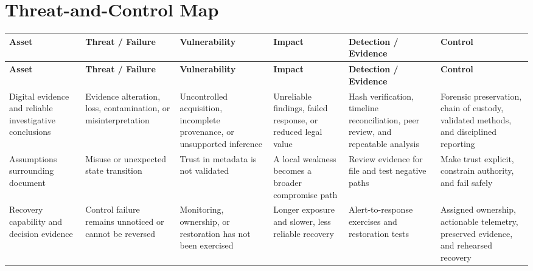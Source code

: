 \documentclass[11pt,letterpaper]{article}
\begin{document}
\section*{Threat-and-Control Map}
\begingroup\scriptsize\setlength{\tabcolsep}{2pt}
\begin{longtable}{>{\raggedright\arraybackslash}p{}>{\raggedright\arraybackslash}p{}>{\raggedright\arraybackslash}p{}>{\raggedright\arraybackslash}p{}>{\raggedright\arraybackslash}p{}>{\raggedright\arraybackslash}p{}}
\toprule\rowcolor{Navy}\color{white}\textbf{Asset} & \color{white}\textbf{Threat / Failure} & \color{white}\textbf{Vulnerability} & \color{white}\textbf{Impact} & \color{white}\textbf{Detection / Evidence} & \color{white}\textbf{Control}\\\midrule
\endfirsthead
\toprule\rowcolor{Navy}\color{white}\textbf{Asset} & \color{white}\textbf{Threat / Failure} & \color{white}\textbf{Vulnerability} & \color{white}\textbf{Impact} & \color{white}\textbf{Detection / Evidence} & \color{white}\textbf{Control}\\\midrule
\endhead
Digital evidence and reliable investigative conclusions & Evidence alteration, loss, contamination, or misinterpretation & Uncontrolled acquisition, incomplete provenance, or unsupported inference & Unreliable findings, failed response, or reduced legal value & Hash verification, timeline reconciliation, peer review, and repeatable analysis & Forensic preservation, chain of custody, validated methods, and disciplined reporting\\\midrule
Assumptions surrounding document & Misuse or unexpected state transition & Trust in metadata is not validated & A local weakness becomes a broader compromise path & Review evidence for file and test negative paths & Make trust explicit, constrain authority, and fail safely\\\midrule
Recovery capability and decision evidence & Control failure remains unnoticed or cannot be reversed & Monitoring, ownership, or restoration has not been exercised & Longer exposure and slower, less reliable recovery & Alert-to-response exercises and restoration tests & Assigned ownership, actionable telemetry, preserved evidence, and rehearsed recovery\\\midrule
\bottomrule
\end{longtable}
\endgroup
\end{document}
